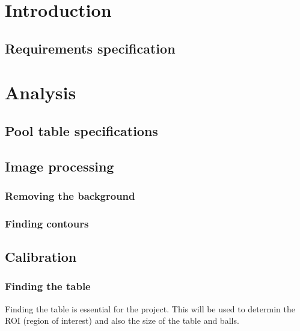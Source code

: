 
\usepackage{float}
\usepackage{graphicx}







\tableofcontents

\chapter{Introduction}
	\section{Requirements specification}
		

\chapter{Analysis}
	\section{Pool table specifications}
		\label{sec:rules}
		

\section{Image processing}
		

	\subsection{Removing the background}
		\label{sec:removeback}
		

	\subsection{Finding contours}
		\label{sec:contours}
		

\section{Calibration}
	\subsection{Finding the table}
		Finding the table is essential for the project. This will be used to determin the ROI (region of interest) and also the size of the table and balls.
